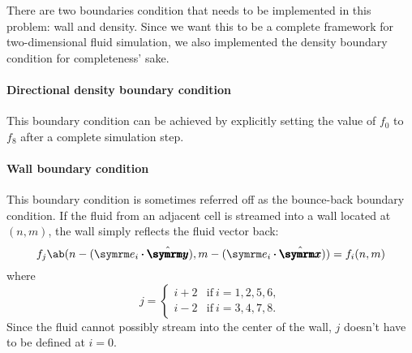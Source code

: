 There are two boundaries condition that needs to be implemented in this problem: wall and density. Since we want this to be a complete framework for two-dimensional fluid simulation, we also implemented the density boundary condition for completeness' sake.

\paragraph{Directional density boundary condition} This boundary condition can be achieved by explicitly setting the value of $f_0$ to $f_8$ after a complete simulation step.

\paragraph{Wall boundary condition} This boundary condition is sometimes referred off as the bounce-back boundary condition. If the fluid from an adjacent cell is streamed into a wall located at $(n, m)$, the wall simply reflects the fluid vector back:
\begin{equation}
	f_j\ab(n - (\e_i \vdot \yhat), m - (\e_i \vdot \xhat)) = f_i(n, m)
\end{equation}
where
\begin{equation}
	j = \begin{cases}
		i + 2 & \textrm{if} ~ i = 1, 2, 5, 6, \\
		i - 2 & \textrm{if} ~ i = 3, 4, 7, 8.
	\end{cases}
\end{equation}
Since the fluid cannot possibly stream into the center of the wall, $j$ doesn't have to be defined at $i = 0$. \cite{adams-no-date}

